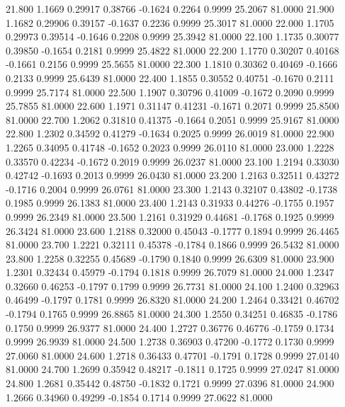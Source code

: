   21.800   1.1669   0.29917   0.38766  -0.1624   0.2264   0.9999  25.2067  81.0000
  21.900   1.1682   0.29906   0.39157  -0.1637   0.2236   0.9999  25.3017  81.0000
  22.000   1.1705   0.29973   0.39514  -0.1646   0.2208   0.9999  25.3942  81.0000
  22.100   1.1735   0.30077   0.39850  -0.1654   0.2181   0.9999  25.4822  81.0000
  22.200   1.1770   0.30207   0.40168  -0.1661   0.2156   0.9999  25.5655  81.0000
  22.300   1.1810   0.30362   0.40469  -0.1666   0.2133   0.9999  25.6439  81.0000
  22.400   1.1855   0.30552   0.40751  -0.1670   0.2111   0.9999  25.7174  81.0000
  22.500   1.1907   0.30796   0.41009  -0.1672   0.2090   0.9999  25.7855  81.0000
  22.600   1.1971   0.31147   0.41231  -0.1671   0.2071   0.9999  25.8500  81.0000
  22.700   1.2062   0.31810   0.41375  -0.1664   0.2051   0.9999  25.9167  81.0000
  22.800   1.2302   0.34592   0.41279  -0.1634   0.2025   0.9999  26.0019  81.0000
  22.900   1.2265   0.34095   0.41748  -0.1652   0.2023   0.9999  26.0110  81.0000
  23.000   1.2228   0.33570   0.42234  -0.1672   0.2019   0.9999  26.0237  81.0000
  23.100   1.2194   0.33030   0.42742  -0.1693   0.2013   0.9999  26.0430  81.0000
  23.200   1.2163   0.32511   0.43272  -0.1716   0.2004   0.9999  26.0761  81.0000
  23.300   1.2143   0.32107   0.43802  -0.1738   0.1985   0.9999  26.1383  81.0000
  23.400   1.2143   0.31933   0.44276  -0.1755   0.1957   0.9999  26.2349  81.0000
  23.500   1.2161   0.31929   0.44681  -0.1768   0.1925   0.9999  26.3424  81.0000
  23.600   1.2188   0.32000   0.45043  -0.1777   0.1894   0.9999  26.4465  81.0000
  23.700   1.2221   0.32111   0.45378  -0.1784   0.1866   0.9999  26.5432  81.0000
  23.800   1.2258   0.32255   0.45689  -0.1790   0.1840   0.9999  26.6309  81.0000
  23.900   1.2301   0.32434   0.45979  -0.1794   0.1818   0.9999  26.7079  81.0000
  24.000   1.2347   0.32660   0.46253  -0.1797   0.1799   0.9999  26.7731  81.0000
  24.100   1.2400   0.32963   0.46499  -0.1797   0.1781   0.9999  26.8320  81.0000
  24.200   1.2464   0.33421   0.46702  -0.1794   0.1765   0.9999  26.8865  81.0000
  24.300   1.2550   0.34251   0.46835  -0.1786   0.1750   0.9999  26.9377  81.0000
  24.400   1.2727   0.36776   0.46776  -0.1759   0.1734   0.9999  26.9939  81.0000
  24.500   1.2738   0.36903   0.47200  -0.1772   0.1730   0.9999  27.0060  81.0000
  24.600   1.2718   0.36433   0.47701  -0.1791   0.1728   0.9999  27.0140  81.0000
  24.700   1.2699   0.35942   0.48217  -0.1811   0.1725   0.9999  27.0247  81.0000
  24.800   1.2681   0.35442   0.48750  -0.1832   0.1721   0.9999  27.0396  81.0000
  24.900   1.2666   0.34960   0.49299  -0.1854   0.1714   0.9999  27.0622  81.0000

